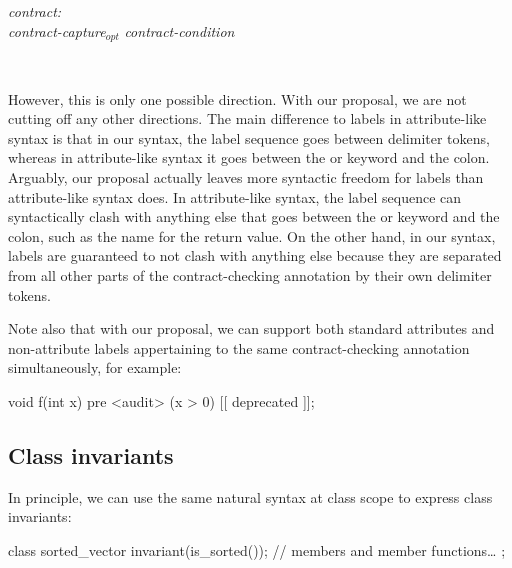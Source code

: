 \begin{adjustwidth}{0.5cm}{0.5cm}

\emph{contract:} \\
\phantom{~~~} \emph{contract-capture}$_{opt}$ \emph{contract-condition}

 \\
\phantom{~~~}

\end{adjustwidth}

However, this is only one possible direction. With our proposal, we are not cutting off any other directions. The main difference to labels in attribute-like syntax is that in our syntax, the label sequence goes between delimiter tokens, whereas in attribute-like syntax it goes between the  or  keyword and the colon. Arguably, our proposal actually leaves more syntactic freedom for labels than attribute-like syntax does. In attribute-like syntax, the label sequence can syntactically clash with anything else that goes between the  or  keyword and the colon, such as the name for the return value. On the other hand, in our syntax, labels are guaranteed to not clash with anything else because they are separated from all other parts of the contract-checking annotation by their own delimiter tokens.

Note also that with our proposal, we can support both standard attributes and non-attribute labels appertaining to the same contract-checking annotation simultaneously, for example:

\begin{codeblock}
void f(int x)
  pre <audit> (x > 0) [[ deprecated ]];
\end{codeblock}


\subsection{Class invariants}
\label{subsec:invariants}

In principle, we can use the same natural syntax at class scope to express class invariants:

\begin{codeblock}
class sorted_vector {
  invariant(is_sorted());
  // members and member functions…
};
\end{codeblock}

